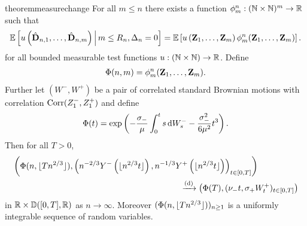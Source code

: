 \begin{restatable}{theorem}{measurechange}
    \label{thm:measure-change}
    For all $m \leq n$ there exists a function $\phi^n_m: ({\mathbb N} \times {\mathbb N})^m \to {\mathbb R}$ such that 
    \begin{equation*}
        {\mathbb E}\left[ 
            u\left( 
                \hat{{\mathbf D}}_{n, 1}, \ldots, \hat{{\mathbf D}}_{n, m}
             \right) 
             \,\middle\vert\,
             m \leq R_n, \Delta_n = 0
         \right]
        =
        {\mathbb E}\left[ 
            u\left( 
                {\mathbf Z}_1, \ldots, {\mathbf Z}_m
             \right)
             \phi^n_m({\mathbf Z}_1, \ldots, {\mathbf Z}_m)
         \right].
    \end{equation*}
    for all bounded measurable test functions $u: ({\mathbb N} \times {\mathbb N}) \to {\mathbb R}$. Define
    \begin{align*}
        \Phi(n, m) = \phi^n_m({\mathbf Z}_1, \ldots, {\mathbf Z}_m).
    \end{align*}
    Further let $(W^-, W^+)$ be a pair of correlated standard Brownian motions with correlation $\operatorname{Corr}(Z^-_1, Z^+_1)$ and define
    \begin{equation*}
        \Phi(t) = \exp \left( 
            - \frac{\sigma_-}{\mu} \int_0^t s \mathop{}\!\mathrm{d} W^-_s - \frac{\sigma_-^2}{6 \mu^2} t^3
         \right).
    \end{equation*}
    Then for all $T > 0$,
    \begin{align*}
        &\left( 
            \Phi(n, \floor{T n^{2/3}}),
            \left(
                n^{-2/3} Y^-\left( \floor{n^{2/3} t} \right),
                n^{-1/3} Y^+\left( \floor{n^{2/3} t} \right)
            \right)_{t \in [0, T]}
        \right) \\
        & \hspace{20em} \todist \left( 
            \Phi(T),
            (\nu_- t, \sigma_+ W^+_t)_{t \in [0, T]}
        \right)
    \end{align*}
    in ${\mathbb R} \times {\mathbb D}([0, T], {\mathbb R})$ as $n \to \infty$. Moreover $(\Phi(n, \lfloor T n^{2/3}\rfloor))_{n \geq 1}$ is a uniformly integrable sequence of random variables.
\end{restatable}